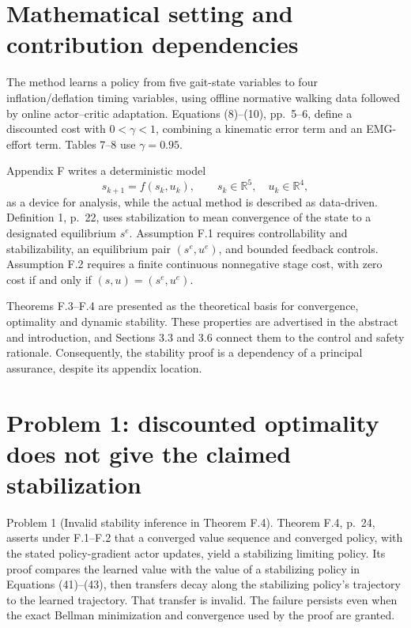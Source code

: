 \documentclass[10pt]{article}
\begin{document}
\section*{Mathematical setting and contribution dependencies}
The method learns a policy from five gait-state variables to four inflation/deflation timing variables, using offline normative walking data followed by online actor–critic adaptation. Equations (8)–(10), pp. 5–6, define a discounted cost with \(0<\gamma<1\), combining a kinematic error term and an EMG-effort term. Tables 7–8 use \(\gamma=0.95\).\par
Appendix F writes a deterministic model \[s_{k+1}=f(s_k,u_k),\qquad s_k\in\mathbb R^5,\quad u_k\in\mathbb R^4,\] as a device for analysis, while the actual method is described as data-driven. Definition 1, p. 22, uses stabilization to mean convergence of the state to a designated equilibrium \(s^e\). Assumption F.1 requires controllability and stabilizability, an equilibrium pair \((s^e,u^e)\), and bounded feedback controls. Assumption F.2 requires a finite continuous nonnegative stage cost, with zero cost if and only if \((s,u)=(s^e,u^e)\).\par
Theorems F.3–F.4 are presented as the theoretical basis for convergence, optimality and dynamic stability. These properties are advertised in the abstract and introduction, and Sections 3.3 and 3.6 connect them to the control and safety rationale. Consequently, the stability proof is a dependency of a principal assurance, despite its appendix location.\par
\section*{Problem 1: discounted optimality does not give the claimed stabilization}
Problem 1 (Invalid stability inference in Theorem F.4).  Theorem F.4, p. 24, asserts under F.1–F.2 that a converged value sequence and converged policy, with the stated policy-gradient actor updates, yield a stabilizing limiting policy. Its proof compares the learned value with the value of a stabilizing policy in Equations (41)–(43), then transfers decay along the stabilizing policy’s trajectory to the learned trajectory. That transfer is invalid. The failure persists even when the exact Bellman minimization and convergence used by the proof are granted.\par
\end{document}
